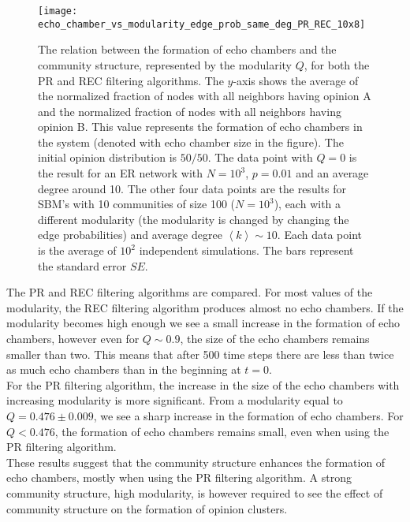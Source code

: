 \documentclass[11 pt , letterpaper , twoside , openright]{book}
\begin{document}
\begin{figure}[H]
	\texttt{[image: echo\_chamber\_vs\_modularity\_edge\_prob\_same\_deg\_PR\_REC\_10x8]}
	\captionsetup{format=plain}
	\caption[Relation between the formation of echo chambers and community structure (modularity $Q$).]{The relation between the formation of echo chambers and the community structure, represented by the modularity $Q$, for both the PR and REC filtering algorithms. The $y$-axis shows the average of the normalized fraction of nodes with all neighbors having opinion A and the normalized fraction of nodes with all neighbors having opinion B. This value represents the formation of echo chambers in the system (denoted with echo chamber size in the figure). The initial opinion distribution is $50/50$. The data point with $Q = 0$ is the result for an ER network with $N = 10^3$, $p = 0.01$ and an average degree around 10. The other four data points are the results for SBM's with 10 communities of size 100 ($N = 10^3$), each with a different modularity (the modularity is changed by changing the edge probabilities) and average degree $\left<k\right> \sim 10$. Each data point is the average of $10^2$ independent simulations. The bars represent the standard error $SE$.}
\label{echo_vs_mod}
\end{figure}
\noindent
The PR and REC filtering algorithms are compared. For most values of the modularity, the REC filtering algorithm produces almost no echo chambers. If the modularity becomes high enough we see a small increase in the formation of echo chambers, however even for $Q \sim 0.9$, the size of the echo chambers remains smaller than two. This means that after 500 time steps there are less than twice as much echo chambers than in the beginning at $t=0$.\\
\newline
For the PR filtering algorithm, the increase in the size of the echo chambers with increasing modularity is more significant. From a modularity equal to $Q = 0.476 \pm 0.009$, we see a sharp increase in the formation of echo chambers. For $Q < 0.476$, the formation of echo chambers remains small, even when using the PR filtering algorithm.\\
\newline
These results suggest that the community structure enhances the formation of echo chambers, mostly when using the PR filtering algorithm. A strong community structure, high modularity, is however required to see the effect of community structure on the formation of opinion clusters.
\newpage
\end{document}
